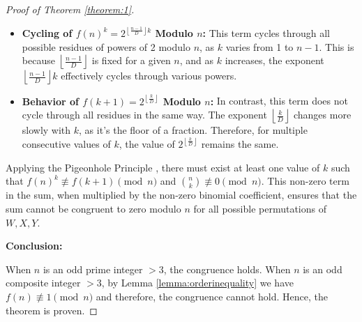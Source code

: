 \documentclass{article}
\theoremstyle{plain}
\theoremstyle{definition}
\begin{document}
\begin{proof}[Proof of Theorem \ref{theorem:1}]
\begin{itemize}
    \item \textbf{Cycling of \( f(n)^k = 2^{\left\lfloor \frac{n-1}{D} \right\rfloor k} \) Modulo \( n \):} This term cycles through all possible residues of powers of 2 modulo \( n \), as \( k \) varies from 1 to \( n-1 \). This is because \( \left\lfloor \frac{n-1}{D} \right\rfloor \) is fixed for a given \( n \), and as \( k \) increases, the exponent \( \left\lfloor \frac{n-1}{D} \right\rfloor k \) effectively cycles through various powers.
    \item \textbf{Behavior of \( f(k+1) = 2^{\left\lfloor \frac{k}{D} \right\rfloor} \) Modulo \( n \):} In contrast, this term does not cycle through all residues in the same way. The exponent \( \left\lfloor \frac{k}{D} \right\rfloor \) changes more slowly with \( k \), as it's the floor of a fraction. Therefore, for multiple consecutive values of \( k \), the value of \( 2^{\left\lfloor \frac{k}{D} \right\rfloor} \) remains the same.
\end{itemize}

Applying the Pigeonhole Principle \cite{rosen2012}, there must exist at least one value of \( k \) such that \( f(n)^k \not\equiv f(k+1) \pmod{n} \) and \( \binom{n}{k} \not\equiv 0 \pmod{n} \). This non-zero term in the sum, when multiplied by the non-zero binomial coefficient, ensures that the sum cannot be congruent to zero modulo \( n \) for all possible permutations of $W, X, Y$.

\textbf{Conclusion:}

When $n$ is an odd prime integer $>3$, the congruence holds. When $n$ is an odd composite integer $>3$, by Lemma \ref{lemma:orderinequality} we have $f(n) \not\equiv 1 \pmod{n}$ and therefore, the congruence cannot hold. Hence, the theorem is proven.
\end{proof}
\end{document}

